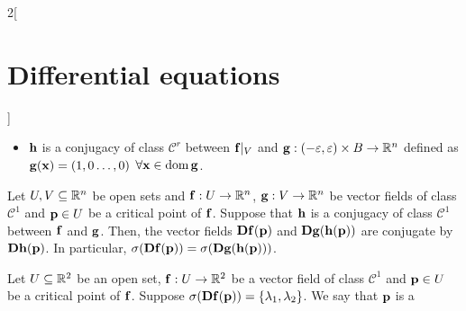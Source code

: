 \documentclass[../../../main_math.tex]{subfiles}
\begin{document}
\begin{multicols}{2}[\section{Differential equations}]
\begin{theorem}
\begin{itemize}
      \item $\boldsymbol{\mathrm{h}}$ is a conjugacy of class $\mathcal{C}^r$ between $\boldsymbol{\mathrm{f}}|_V$ and $\boldsymbol{\mathrm{g}}:(-\varepsilon,\varepsilon)\times B\rightarrow\mathbb{R}^n$ defined as $\boldsymbol{\mathrm{g}}(\boldsymbol{\mathrm{x}})=(1,0\ldots,0)$ $\forall \boldsymbol{\mathrm{x}}\in\operatorname{dom}\boldsymbol{\mathrm{g}}$.
    \end{itemize}
  \end{theorem}
  \begin{lemma}
    Let $U,V\subseteq \mathbb{R}^n$ be open sets and $\boldsymbol{\mathrm{f}}:U\rightarrow\mathbb{R}^n$, $\boldsymbol{\mathrm{g}}:V\rightarrow\mathbb{R}^n$ be vector fields of class $\mathcal{C}^1$ and $\boldsymbol{\mathrm{p}}\in U$ be a critical point of $\boldsymbol{\mathrm{f}}$. Suppose that $\boldsymbol{\mathrm{h}}$ is a conjugacy of class $\mathcal{C}^1$ between $\boldsymbol{\mathrm{f}}$ and $\boldsymbol{\mathrm{g}}$. Then, the vector fields $\boldsymbol{\mathrm{Df}}(\boldsymbol{\mathrm{p}})$ and $\boldsymbol{\mathrm{Dg}}(\boldsymbol{\mathrm{h}}(\boldsymbol{\mathrm{p}}))$ are conjugate by $\boldsymbol{\mathrm{Dh}}(\boldsymbol{\mathrm{p}})$. In particular, $\sigma(\boldsymbol{\mathrm{Df}}(\boldsymbol{\mathrm{p}}))=\sigma(\boldsymbol{\mathrm{Dg}}(\boldsymbol{\mathrm{h}}(\boldsymbol{\mathrm{p}})))$.
  \end{lemma}
  \begin{definition}
    Let $U\subseteq \mathbb{R}^2$ be an open set, $\boldsymbol{\mathrm{f}}:U\rightarrow\mathbb{R}^2$ be a vector field of class $\mathcal{C}^1$ and $\boldsymbol{\mathrm{p}}\in U$ be a critical point of $\boldsymbol{\mathrm{f}}$. Suppose $\sigma(\boldsymbol{\mathrm{Df}}(\boldsymbol{\mathrm{p}}))=\{\lambda_1,\lambda_2\}$. We say that $\boldsymbol{\mathrm{p}}$ is a
\end{definition}
\end{multicols}
\end{document}
